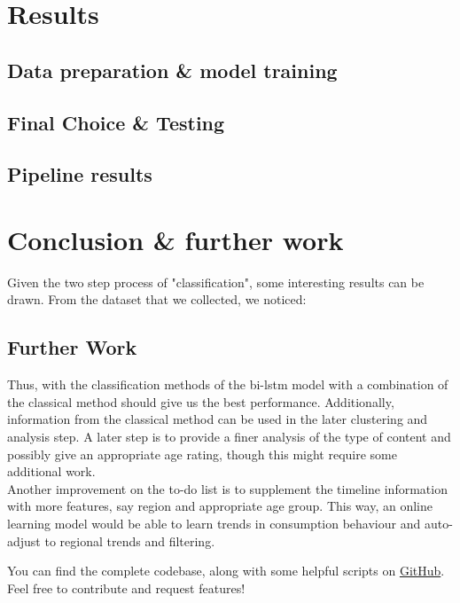 \documentclass{article}[A4]
\begin{document}
\section{Results}

\subsection{Data preparation \& model training}

\subsection{Final Choice \& Testing}

\subsection{Pipeline results}

\section{Conclusion \& further work}

Given the two step process of "classification", some interesting results can be drawn. From the dataset that we collected, we noticed:

\subsection{Further Work}

Thus, with the classification methods of the bi-lstm model with a combination of the classical method should give us the best performance. Additionally, information from the classical method can be used in the later clustering and analysis step. A later step is to provide a finer analysis of the type of content and possibly give an appropriate age rating, though this might require some additional work. \\

Another improvement on the to-do list is to supplement the timeline information with more features, say region and appropriate age group. This way, an online learning model would be able to learn trends in consumption behaviour and auto-adjust to regional trends and filtering.

You can find the complete codebase, along with some helpful scripts on \href{https://github.com/Pk13055/transcript-based-classification}{GitHub}. Feel free to contribute and request features!



\end{document}

